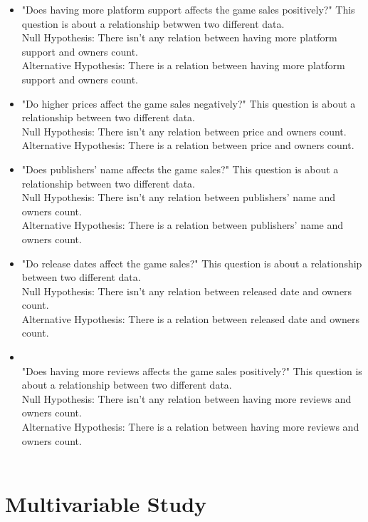\documentclass[conference]{IEEEtran}
\begin{document}
\begin{itemize}
    \item "Does having more platform support affects the game sales positively?" This question is about a relationship betwwen two different data.\\Null
Hypothesis: There isn't any relation between having more platform support and owners count.\\ Alternative Hypothesis: There is a relation between having more platform support and owners count. \\
    \item "Do higher prices affect the game sales negatively?" This question is about a relationship between two different data.\\Null
Hypothesis: There isn't any relation between price and owners count.\\ Alternative Hypothesis: There is a relation between price and owners count. \\
    \item "Does publishers' name affects the game sales?" This question is about a relationship between two different data.\\Null
Hypothesis: There isn't any relation between  publishers' name and owners count.\\ Alternative Hypothesis: There is a relation between  publishers' name and owners count. \\
    \item "Do release dates affect the game sales?" This question is about a relationship between two different data.\\Null
Hypothesis: There isn't any relation between released date and owners count.\\ Alternative Hypothesis: There is a relation between released date and owners count. \\
    \item \\"Does having more reviews affects the game sales positively?" This question is about a relationship between two different data.\\Null
Hypothesis: There isn't any relation between  having more reviews and owners count.\\ Alternative Hypothesis: There is a relation between  having more reviews and owners count. \\\\
\end{itemize}


\section{Multivariable Study}
\end{document}
